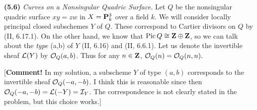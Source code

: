 \documentclass[12pt]{article}
\begin{document}
\begin{exercise}
{\bfseries (5.6)} {\em Curves on a Nonsingular Quadric Surface.}
Let $Q$ be the nonsingular quadric surface $xy=zw$ in $X=\P_k^3$
over a field $k$. We will consider locally principal closed
subschemes $Y$ of $Q$. These correspond to Cartier divisors on
$Q$ by (II, 6.17.1). On the other hand, we know that 
$\pic Q\isom\Z\oplus\Z$, so we can talk about the
{\em type} (a,b) of $Y$ (II, 6.16) and (II, 6.6.1). Let us denote
the invertible sheaf $\sL(Y)$ by $\so_Q(a,b)$. Thus
for any $n\in\Z$, $\so_Q(n)=\so_Q(n,n).$

[{\bf Comment!} In my solution, a subscheme $Y$ of type 
$(a,b)$ corresponds to the invertible sheaf $\soq(-a,-b)$. 
I think this is reasonable since then $\soq(-a,-b)=\sL(-Y)=\sI_Y$.  
The correspondence is not clearly stated in the problem,
but this choice works.] 


\end{exercise}
\end{document}
